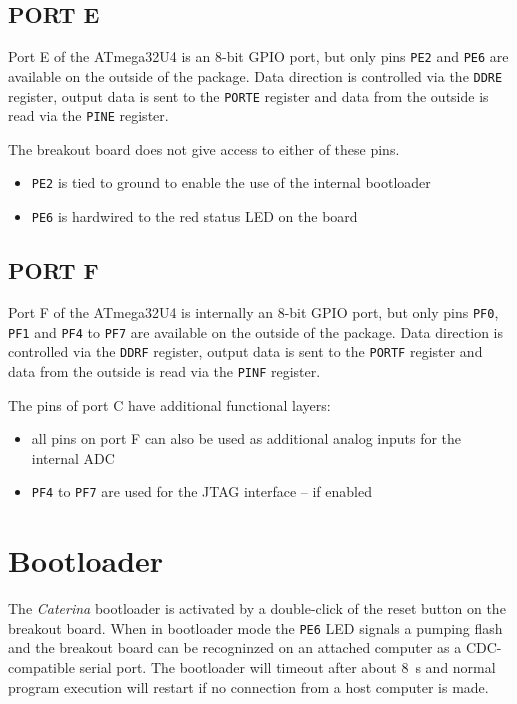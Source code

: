 \begin{multicols}{2}
\subsection{PORT E}
  Port E of the ATmega32U4 is an 8-bit GPIO port, but only pins \lstinline!PE2! and \lstinline!PE6!
  are available on the outside of the package. Data direction is controlled via the \lstinline!DDRE!
  register, output data is sent to the \lstinline!PORTE! register and
  data from the outside is read via the \lstinline!PINE! register.

  The breakout board does not give access to either of these pins.
  \begin{itemize}\tightlist
    \item \lstinline!PE2! is tied to ground to enable the use of the internal bootloader
    \item \lstinline!PE6! is hardwired to the red status LED on the board
  \end{itemize}

\subsection{PORT F}
  Port F of the ATmega32U4 is internally an 8-bit GPIO port, but only pins \lstinline!PF0!, \lstinline!PF1!
  and \lstinline!PF4! to \lstinline!PF7!
  are available on the outside of the package. Data direction is controlled via the \lstinline!DDRF!
  register, output data is sent to the \lstinline!PORTF! register and
  data from the outside is read via the \lstinline!PINF! register.

  The pins of port C have additional functional layers:
  \begin{itemize}\tightlist
    \item all pins on port F can also be used as additional analog inputs for the internal ADC
    \item \lstinline!PF4! to \lstinline!PF7! are used for the JTAG interface -- if enabled
  \end{itemize}

\section{Bootloader}
  The \emph{Caterina} bootloader is activated by a double-click of the reset button
  on the breakout board. When in bootloader mode the \lstinline!PE6! LED signals a
  pumping flash and the breakout board can be recogninzed on an attached computer as
  a CDC-compatible serial port. The bootloader will timeout after about \SI{8}{\second}
  and normal program execution will restart if no connection from a host computer is made.


\end{multicols}
